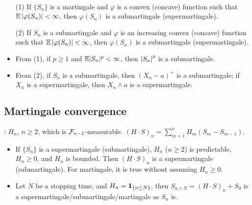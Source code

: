 \documentclass[10pt,a4paper]{article}
\begin{document}
\begin{thmbox}
	\begin{theorem}\label{thm:martingale_trans}\rm
		\
		\begin{enumerate}
			\item[(1)] If $\{S_n\}$ is a martingale and $\varphi$ is a convex (concave) function such that $\mathbb E\left\lvert\varphi(S_n)\right\rvert<\infty $, then $\varphi(S_n)$ is a submartingale (supermartingale).   
			\item[(2)] If $S_n$ is a submartingale and $\varphi$ is an increasing convex (concave) function such that $\mathbb E\left\lvert\varphi(S_n)\right\rvert<\infty $, then $\varphi(S_n)$ is a submartingale (supermartingale). 
		\end{enumerate}
	\end{theorem}
\end{thmbox}
\begin{itemize}
	\item From (1), if $p\geq 1$ and $\mathbb E|S_n|^p<\infty $, then $\left\lvert S_n\right\rvert^p$ is a submartingale.   
	\item From (2), if $S_n$ is a submartingale, then $(X_n-a)^+$ is a submartingale; if $X_n$ is a supermartingale, then $X_n\wedge a$ is a supermartingale.    
\end{itemize}

\subsection{Martingale convergence}\label{sec:martingale_cvg}

: $H_n$, $n\geq 2$, which is ${\cal F}_{n-1}$-measurable. $(H\cdot S)_n=\sum_{m=1}^{n}H_m(S_{m}-S_{m-1})$.    
\begin{itemize}
	\item If $\{S_n\}$ is a supermartingale (submartingale), $H_n$ ($n\geq 2$) is predictable, $H_n\geq 0$, and $H_n$ is bounded. Then $(H\cdot S)_n$ is a supermartingale (submartingale). For martingale, it is true without assuming $H_n\geq 0$.    
	\item Let $N$ be a stopping time, and $H_n={\boldsymbol 1}_{\{n\leq N\}}$, then $S_{n\wedge N}=(H\cdot S)_n+S_0$ is a supermartingale/submartingale/martingale as $S_n$ is.
\end{itemize}
\end{document}
